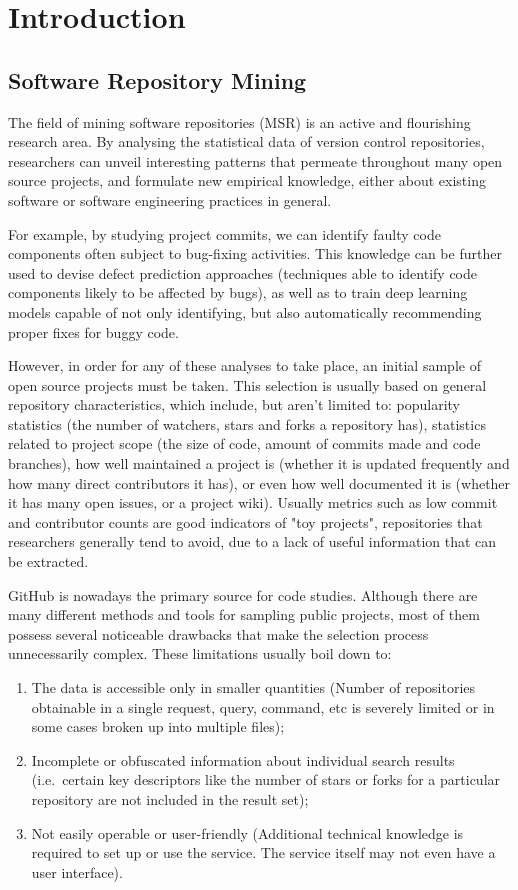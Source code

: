 \chapter{Introduction}

\section{Software Repository Mining}

The field of mining software repositories (MSR) is an active and flourishing research area.
By analysing the statistical data of version control repositories, researchers can unveil interesting patterns that permeate throughout many open source projects, and formulate new empirical knowledge, either about existing software or software engineering practices in general.

For example, by studying project commits, we can identify faulty code components often subject to bug-fixing activities.
This knowledge can be further used to devise defect prediction approaches (techniques able to identify code components likely to be affected by bugs), as well as to train deep learning models capable of not only identifying, but also automatically recommending proper fixes for buggy code.

However, in order for any of these analyses to take place, an initial sample of open source projects must be taken.
This selection is usually based on general repository characteristics, which include, but aren't limited to: popularity statistics (the number of watchers, stars and forks a repository has), statistics related to project scope (the size of code, amount of commits made and code branches), how well maintained a project is (whether it is updated frequently and how many direct contributors it has), or even how well documented it is (whether it has many open issues, or a project wiki).
Usually metrics such as low commit and contributor counts are good indicators of "toy projects", repositories that researchers generally tend to avoid, due to a lack of useful information that can be extracted.

GitHub is nowadays the primary source for code studies. Although there are many different methods and tools for sampling public projects, most of them possess several noticeable drawbacks that make the selection process unnecessarily complex. These limitations usually boil down to:
\begin{enumerate}
    \item The data is accessible only in smaller quantities (Number of repositories obtainable in a single request, query, command, etc is severely limited or in some cases broken up into multiple files);
    \item Incomplete or obfuscated information about individual search results (i.e.\ certain key descriptors like the number of stars or forks for a particular repository are not included in the result set);
    \item Not easily operable or user-friendly (Additional technical knowledge is required to set up or use the service. The service itself may not even have a user interface).
\end{enumerate}

